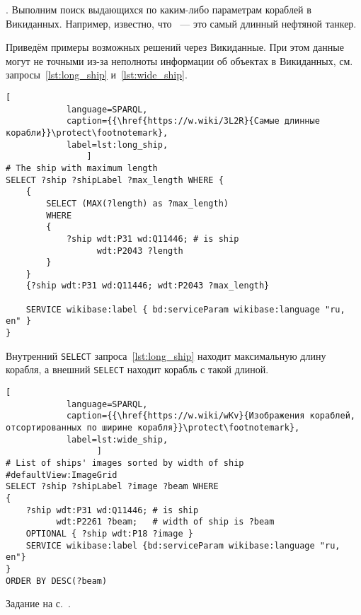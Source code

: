 \begin{task}
\label{answer:ship_Guinness}
. 
    Выполним поиск выдающихся по каким-либо параметрам кораблей в Викиданных.
    Например, известно, что ~--- это самый длинный нефтяной танкер.

Приведём примеры возможных решений через Викиданные. 
При этом данные могут не точными из-за неполноты информации об объектах в Викиданных, 
    см. запросы~\ref{lst:long_ship} и~\ref{lst:wide_ship}.

\begin{lstlisting}[ 
            language=SPARQL, 
            caption={{\href{https://w.wiki/3L2R}{Самые длинные корабли}}\protect\footnotemark}, 
            label=lst:long_ship,
                ]
# The ship with maximum length
SELECT ?ship ?shipLabel ?max_length WHERE {
	{
		SELECT (MAX(?length) as ?max_length)
		WHERE
		{
			?ship wdt:P31 wd:Q11446; # is ship
				  wdt:P2043 ?length
		}
	}
	{?ship wdt:P31 wd:Q11446; wdt:P2043 ?max_length}
		
	SERVICE wikibase:label { bd:serviceParam wikibase:language "ru, en" }
}  
\end{lstlisting}

Внутренний \lstinline|SELECT| запроса~\ref{lst:long_ship} находит максимальную длину корабля, 
    а внешний \lstinline|SELECT| находит корабль с такой длиной.




\newpage
\begin{lstlisting}[ 
            language=SPARQL, 
            caption={{\href{https://w.wiki/wKv}{Изображения кораблей, отсортированных по ширине корабля}}\protect\footnotemark}, 
            label=lst:wide_ship, 
                  ]
# List of ships' images sorted by width of ship
#defaultView:ImageGrid
SELECT ?ship ?shipLabel ?image ?beam WHERE 
{
    ?ship wdt:P31 wd:Q11446; # is ship
          wdt:P2261 ?beam;   # width of ship is ?beam
    OPTIONAL { ?ship wdt:P18 ?image }
    SERVICE wikibase:label {bd:serviceParam wikibase:language "ru, en"}
}
ORDER BY DESC(?beam)
\end{lstlisting}
\label{answer:ship_3}

\small{Задание на с.~\pageref{question:ship_3}.}
\end{task}




